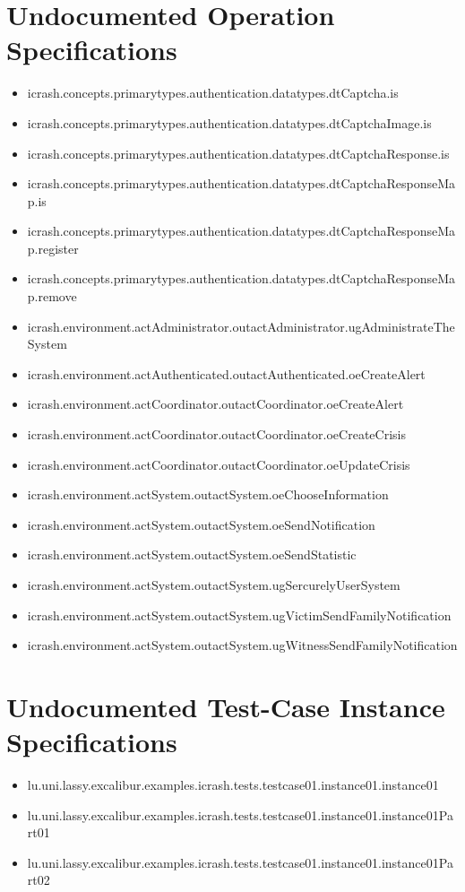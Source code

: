 \section[Undocumented Operation Specifications]{Undocumented Operation Specifications}
\begin{itemize}
\item icrash.concepts.primarytypes.authentication.datatypes.dtCaptcha.is 
\item icrash.concepts.primarytypes.authentication.datatypes.dtCaptchaImage.is 
\item icrash.concepts.primarytypes.authentication.datatypes.dtCaptchaResponse.is 
\item icrash.concepts.primarytypes.authentication.datatypes.dtCaptchaResponseMap.is 
\item icrash.concepts.primarytypes.authentication.datatypes.dtCaptchaResponseMap.register 
\item icrash.concepts.primarytypes.authentication.datatypes.dtCaptchaResponseMap.remove 
\item icrash.environment.actAdministrator.outactAdministrator.ugAdministrateTheSystem 
\item icrash.environment.actAuthenticated.outactAuthenticated.oeCreateAlert 
\item icrash.environment.actCoordinator.outactCoordinator.oeCreateAlert 
\item icrash.environment.actCoordinator.outactCoordinator.oeCreateCrisis 
\item icrash.environment.actCoordinator.outactCoordinator.oeUpdateCrisis 
\item icrash.environment.actSystem.outactSystem.oeChooseInformation 
\item icrash.environment.actSystem.outactSystem.oeSendNotification 
\item icrash.environment.actSystem.outactSystem.oeSendStatistic 
\item icrash.environment.actSystem.outactSystem.ugSercurelyUserSystem 
\item icrash.environment.actSystem.outactSystem.ugVictimSendFamilyNotification 
\item icrash.environment.actSystem.outactSystem.ugWitnessSendFamilyNotification 
\end{itemize}





\section[Undocumented Test-Case Instance Specifications]{Undocumented Test-Case Instance Specifications}
\begin{itemize}
\item lu.uni.lassy.excalibur.examples.icrash.tests.testcase01.instance01.instance01 
\item lu.uni.lassy.excalibur.examples.icrash.tests.testcase01.instance01.instance01Part01 
\item lu.uni.lassy.excalibur.examples.icrash.tests.testcase01.instance01.instance01Part02 
\end{itemize}



